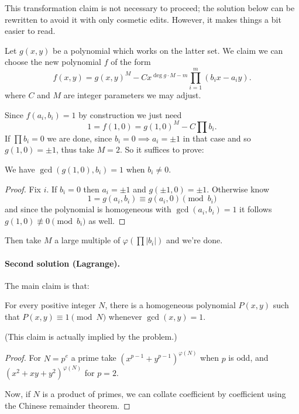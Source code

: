 \begin{remark*}
  This transformation claim is not necessary to proceed;
  the solution below can be rewritten to avoid it with only cosmetic edits.
  However, it makes things a bit easier to read.
\end{remark*}

Let $g(x,y)$ be a polynomial which works on the latter set.
We claim we can choose the new polynomial $f$ of the form
\[ f(x,y) = g(x,y)^{M} - C x^{\deg g \cdot M-m} \prod_{i=1}^m (b_i x - a_i y). \]
where $C$ and $M$ are integer parameters we may adjust.

Since $f(a_i, b_i) = 1$ by construction we just need
\[ 1 = f(1,0) = g(1,0)^M - C \prod b_i. \]
If $\prod b_i = 0$ we are done,
since $b_i = 0 \implies a_i = \pm 1$ in that case
and so $g(1, 0) = \pm 1$, thus take $M = 2$.
So it suffices to prove:
\begin{claim*}
  We have $\gcd\left( g(1,0), b_i \right) = 1$ when $b_i \neq 0$.
\end{claim*}
\begin{proof}
  Fix $i$. If $b_i = 0$ then $a_i = \pm 1$ and $g(\pm 1,0) = \pm 1$.
  Otherwise know
  \[ 1 = g(a_i, b_i) \equiv g(a_i, 0) \pmod{b_i} \]
  and since the polynomial is homogeneous with $\gcd(a_i, b_i) = 1$
  it follows $g(1,0) \not\equiv 0 \pmod{b_i}$ as well.
\end{proof}
Then take $M$ a large multiple of $\varphi(\prod |b_i|)$ and we're done.

\paragraph{Second solution (Lagrange).}
The main claim is that:
\begin{claim*}
  For every positive integer $N$,
  there is a homogeneous polynomial $P(x,y)$ such that
  $P(x,y) \equiv 1 \pmod N$ whenever $\gcd(x,y) = 1$.
\end{claim*}
(This claim is actually implied by the problem.)
\begin{proof}
  For $N = p^e$ a prime take $(x^{p-1} + y^{p-1})^{\varphi(N)}$
  when $p$ is odd, and $(x^2+xy+y^2)^{\varphi(N)}$ for $p=2$.

  Now, if $N$ is a product of primes,
  we can collate coefficient by coefficient using the
  Chinese remainder theorem.
\end{proof}

